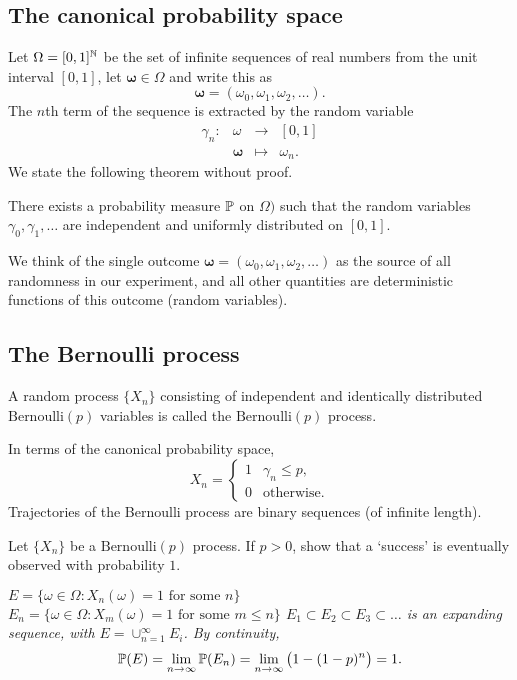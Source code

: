 \subsection{The canonical probability space}

Let $\Omega = [0,1]^{\mathbb{N}}$ be the set of infinite sequences of real numbers from the unit interval $[0,1]$, let $\mathbf{\omega}\in\Omega$ and write this as
\[
\mathbf{\omega} = (\omega_0,\omega_1,\omega_2,\ldots).
\]
The $n$th term of the sequence is extracted by the random variable
\[
\begin{array}{rccl}
	\gamma_n:	& \omega			& \to		& [0,1] \\
				& \mathbf{\omega}	& \mapsto	& \omega_n.
\end{array}
\]
We state the following theorem without proof.
\begin{theorem}
There exists a probability measure $\mathbb{P}$ on $\Omega)$ such that the random variables $\gamma_0,\gamma_1,\ldots$ are independent and uniformly distributed on $[0,1]$.
\end{theorem}

We think of the single outcome $\mathbf{\omega} = (\omega_0,\omega_1,\omega_2,\ldots)$ as the source of all randomness in our experiment, and all other quantities are deterministic functions of this outcome (random variables).

\subsection{The Bernoulli process}\label{sec:bernoulliprocs}
\begin{definition}
A random process $\{X_n\}$ consisting of independent and identically distributed $\text{Bernoulli}(p)$ variables is called the $\text{Bernoulli}(p)$ process.
\end{definition}

In terms of the canonical probability space,
\[
X_n = \begin{cases}
	1	& \gamma_n\leq p, \\
	0	& \text{otherwise.}
\end{cases}
\]
Trajectories of the Bernoulli process are binary sequences (of infinite length).

\begin{example}
Let $\{X_n\}$ be a $\text{Bernoulli}(p)$ process. If $p>0$, show that a `success' is eventually observed with probability $1$.
\begin{solution}
\bit
\it $E 		= \{\omega\in\Omega:X_n(\omega)=1 \text{ for some } n\}$
\it $E_n 	= \{\omega\in\Omega:X_m(\omega)=1 \text{ for some } m\leq n\}$
\it $E_1\subset E_2\subset E_3\subset\ldots$ is an expanding sequence, with $E=\cup_{n=1}^{\infty} E_i$.
\it By continuity, 
\[
\mathbb{P}(E) = \lim_{n\to\infty}\mathbb{P}(E_n) = \lim_{n\to\infty}\big(1 - (1-p)^n\big) = 1.
\]
\eit
\end{solution}
\end{example}

